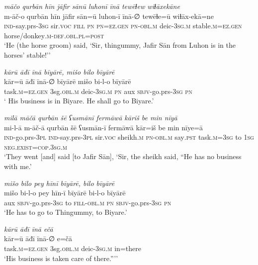 \ea \label{ŠJ.71}
\textit{māčo qurbān hīn jāfir sānū luhonī īnā tewēɫew wiɫāxekāne} \\ 
\gll m-āč-o qurbān hīn jāfir sān=ū luhon-ī īnā-∅ tewēɫe=ū wiɫāx-ekā=ne \\ 
 \textsc{ind-}say.prs\textsc{-3sg} sir.\textsc{voc} \textsc{fill} \textsc{pn} \textsc{pn}\textsc{=ez.gen} \textsc{pn}\textsc{-obl}\textsc{.m} deic\textsc{-3sg}\textsc{.m} stable\textsc{.m}\textsc{=ez.gen} horse/donkey\textsc{.m}\textsc{-def}\textsc{.obl}\textsc{.pl}\textsc{=\textsc{post}} \\ 
\glt `He (the horse groom) said, ‘Sir, thingummy, Jafir Sān from Luhon is in the horses’ stable!’'
\z 
 
\ea \label{ŠJ.75}
\textit{kārū āđī īnā bīyārē, mišo bilo bīyārē} \\ 
\gll kār=ū āđī īnā-∅ bīyārē mišo bi-l-o bīyārē \\ 
 task\textsc{.m}\textsc{=ez.gen} 3sg\textsc{.obl}\textsc{.m} deic\textsc{-3sg}\textsc{.m} \textsc{pn} aux \textsc{sbjv-}go.prs\textsc{-3sg} \textsc{pn} \\ 
\glt ` His business is in Biyare. He shall go to Biyare.'
\z 
 
\ea \label{ŠJ.77}
\textit{milā māčā qurbān šē ʕusmānī fermāwā kāriš be min nīyā} \\ 
\gll mi-l-ā m-āč-ā qurbān šē ʕusmān-ī fermāwā kār=iš be min nīye=ā \\ 
 \textsc{ind-}go.prs\textsc{-3pl} \textsc{ind-}say.prs\textsc{-3pl} sir.\textsc{voc} sheikh\textsc{.m} \textsc{pn}\textsc{-obl}\textsc{.m} say\textsc{.pst} task\textsc{.m}\textsc{=3sg} to \textsc{1sg} \textsc{\textsc{neg.}exist}\textsc{=cop}\textsc{.3sg}\textsc{.m} \\ 
\glt `They went [and] said [to Jafir Sān], ‘Sir, the sheikh said, “He has no business with me.'
\z 
 
\ea \label{ŠJ.78}
\textit{mišo bilo pey hīnī bīyārē, bilo bīyārē} \\ 
\gll mišo bi-l-o pey hīn-ī bīyārē bi-l-o bīyārē \\ 
 aux \textsc{sbjv-}go.prs\textsc{-3sg} to \textsc{fill}\textsc{-obl}\textsc{.m} \textsc{pn} \textsc{sbjv-}go.prs\textsc{-3sg} \textsc{pn} \\ 
\glt `He has to go to Thingummy, to Biyare.'
\z 
 
\ea \label{ŠJ.79}
\textit{kārū āđī īnā ečā} \\ 
\gll kār=ū āđī īnā-∅ e=čā \\ 
 task\textsc{.m}\textsc{=ez.gen} 3sg\textsc{.obl}\textsc{.m} deic\textsc{-3sg}\textsc{.m} in=there \\ 
\glt `His business is taken care of there.”’'
\z 
 
